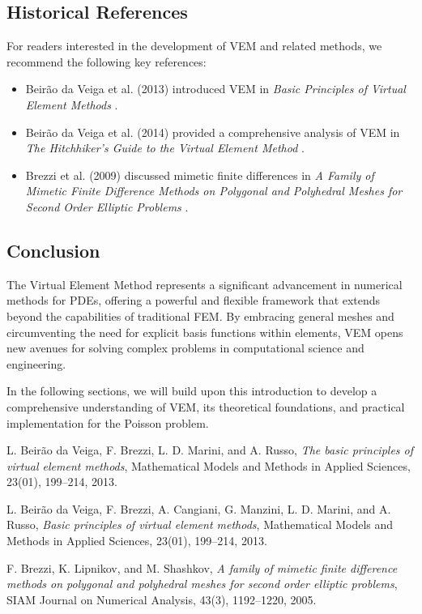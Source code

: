 \documentclass[class=article, crop=false]{standalone}
\begin{document}
\subsection{Historical References}

For readers interested in the development of VEM and related methods, we recommend the following key references:

\begin{itemize}
    \item Beir\~ao da Veiga et al. (2013) introduced VEM in \emph{Basic Principles of Virtual Element Methods} \cite{beirao2013basic}.
    \item Beir\~ao da Veiga et al. (2014) provided a comprehensive analysis of VEM in \emph{The Hitchhiker's Guide to the Virtual Element Method} \cite{beirao2014hitchhiker}.
    \item Brezzi et al. (2009) discussed mimetic finite differences in \emph{A Family of Mimetic Finite Difference Methods on Polygonal and Polyhedral Meshes for Second Order Elliptic Problems} \cite{brezzi2009family}.
\end{itemize}

\subsection{Conclusion}

The Virtual Element Method represents a significant advancement in numerical methods for PDEs, offering a powerful and flexible framework that extends beyond the capabilities of traditional FEM. By embracing general meshes and circumventing the need for explicit basis functions within elements, VEM opens new avenues for solving complex problems in computational science and engineering.

In the following sections, we will build upon this introduction to develop a comprehensive understanding of VEM, its theoretical foundations, and practical implementation for the Poisson problem.

\begin{thebibliography}{9}

L. Beir\~ao da Veiga, F. Brezzi, L. D. Marini, and A. Russo,
\newblock \emph{The basic principles of virtual element methods},
\newblock Mathematical Models and Methods in Applied Sciences, 23(01), 199--214, 2013.

L. Beir\~ao da Veiga, F. Brezzi, A. Cangiani, G. Manzini, L. D. Marini, and A. Russo,
\newblock \emph{Basic principles of virtual element methods},
\newblock Mathematical Models and Methods in Applied Sciences, 23(01), 199--214, 2013.

F. Brezzi, K. Lipnikov, and M. Shashkov,
\newblock \emph{A family of mimetic finite difference methods on polygonal and polyhedral meshes for second order elliptic problems},
\newblock SIAM Journal on Numerical Analysis, 43(3), 1192--1220, 2005.

\end{thebibliography}
\end{document}
